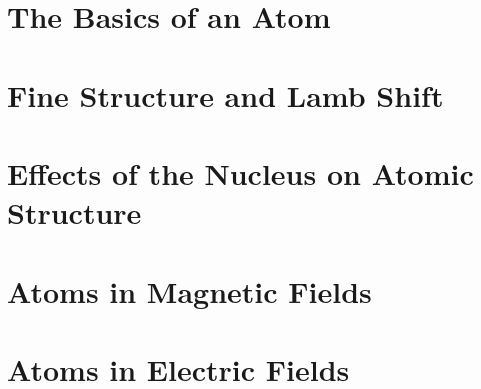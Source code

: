 \documentclass{book}
\theoremstyle{definition}
\begin{document}


\chapter{The Basics of an Atom}








\chapter{Fine Structure and Lamb Shift}
















\chapter{Effects of the Nucleus on Atomic Structure}














\chapter{Atoms in Magnetic Fields}












\chapter{Atoms in Electric Fields}
\end{document}

